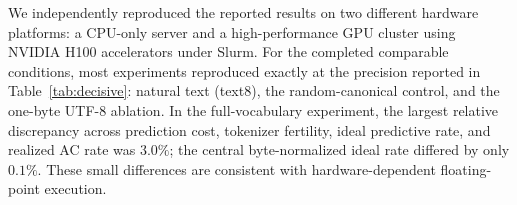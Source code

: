  We independently reproduced the reported results on two different hardware platforms: a CPU-only server and a high-performance GPU cluster using NVIDIA H100 accelerators under Slurm. For the completed comparable conditions, most experiments reproduced exactly at the precision reported in Table~\ref{tab:decisive}: natural text (text8), the random-canonical control, and the one-byte UTF-8 ablation. In the full-vocabulary \MinProb{} experiment, the largest relative discrepancy across prediction cost, tokenizer fertility, ideal predictive rate, and realized AC rate was $3.0\%$; the central byte-normalized ideal rate differed by only $0.1\%$. These small differences are consistent with hardware-dependent floating-point execution.
